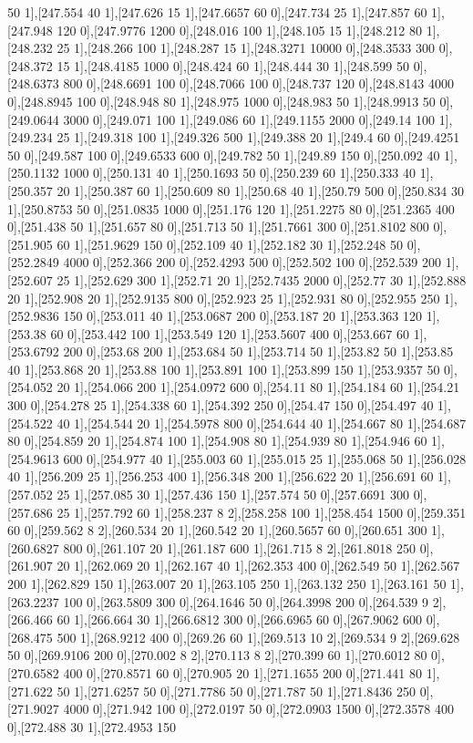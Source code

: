 {50 1],[247.554 40 1],[247.626 15 1],[247.6657 60 0],[247.734 25 1],[247.857 60 1],[247.948 120 0],[247.9776 1200 0],[248.016 100 1],[248.105 15 1],[248.212 80 1],[248.232 25 1],[248.266 100 1],[248.287 15 1],[248.3271 10000 0],[248.3533 300 0],[248.372 15 1],[248.4185 1000 0],[248.424 60 1],[248.444 30 1],[248.599 50 0],[248.6373 800 0],[248.6691 100 0],[248.7066 100 0],[248.737 120 0],[248.8143 4000 0],[248.8945 100 0],[248.948 80 1],[248.975 1000 0],[248.983 50 1],[248.9913 50 0],[249.0644 3000 0],[249.071 100 1],[249.086 60 1],[249.1155 2000 0],[249.14 100 1],[249.234 25 1],[249.318 100 1],[249.326 500 1],[249.388 20 1],[249.4 60 0],[249.4251 50 0],[249.587 100 0],[249.6533 600 0],[249.782 50 1],[249.89 150 0],[250.092 40 1],[250.1132 1000 0],[250.131 40 1],[250.1693 50 0],[250.239 60 1],[250.333 40 1],[250.357 20 1],[250.387 60 1],[250.609 80 1],[250.68 40 1],[250.79 500 0],[250.834 30 1],[250.8753 50 0],[251.0835 1000 0],[251.176 120 1],[251.2275 80 0],[251.2365 400 0],[251.438 50 1],[251.657 80 0],[251.713 50 1],[251.7661 300 0],[251.8102 800 0],[251.905 60 1],[251.9629 150 0],[252.109 40 1],[252.182 30 1],[252.248 50 0],[252.2849 4000 0],[252.366 200 0],[252.4293 500 0],[252.502 100 0],[252.539 200 1],[252.607 25 1],[252.629 300 1],[252.71 20 1],[252.7435 2000 0],[252.77 30 1],[252.888 20 1],[252.908 20 1],[252.9135 800 0],[252.923 25 1],[252.931 80 0],[252.955 250 1],[252.9836 150 0],[253.011 40 1],[253.0687 200 0],[253.187 20 1],[253.363 120 1],[253.38 60 0],[253.442 100 1],[253.549 120 1],[253.5607 400 0],[253.667 60 1],[253.6792 200 0],[253.68 200 1],[253.684 50 1],[253.714 50 1],[253.82 50 1],[253.85 40 1],[253.868 20 1],[253.88 100 1],[253.891 100 1],[253.899 150 1],[253.9357 50 0],[254.052 20 1],[254.066 200 1],[254.0972 600 0],[254.11 80 1],[254.184 60 1],[254.21 300 0],[254.278 25 1],[254.338 60 1],[254.392 250 0],[254.47 150 0],[254.497 40 1],[254.522 40 1],[254.544 20 1],[254.5978 800 0],[254.644 40 1],[254.667 80 1],[254.687 80 0],[254.859 20 1],[254.874 100 1],[254.908 80 1],[254.939 80 1],[254.946 60 1],[254.9613 600 0],[254.977 40 1],[255.003 60 1],[255.015 25 1],[255.068 50 1],[256.028 40 1],[256.209 25 1],[256.253 400 1],[256.348 200 1],[256.622 20 1],[256.691 60 1],[257.052 25 1],[257.085 30 1],[257.436 150 1],[257.574 50 0],[257.6691 300 0],[257.686 25 1],[257.792 60 1],[258.237 8 2],[258.258 100 1],[258.454 1500 0],[259.351 60 0],[259.562 8 2],[260.534 20 1],[260.542 20 1],[260.5657 60 0],[260.651 300 1],[260.6827 800 0],[261.107 20 1],[261.187 600 1],[261.715 8 2],[261.8018 250 0],[261.907 20 1],[262.069 20 1],[262.167 40 1],[262.353 400 0],[262.549 50 1],[262.567 200 1],[262.829 150 1],[263.007 20 1],[263.105 250 1],[263.132 250 1],[263.161 50 1],[263.2237 100 0],[263.5809 300 0],[264.1646 50 0],[264.3998 200 0],[264.539 9 2],[266.466 60 1],[266.664 30 1],[266.6812 300 0],[266.6965 60 0],[267.9062 600 0],[268.475 500 1],[268.9212 400 0],[269.26 60 1],[269.513 10 2],[269.534 9 2],[269.628 50 0],[269.9106 200 0],[270.002 8 2],[270.113 8 2],[270.399 60 1],[270.6012 80 0],[270.6582 400 0],[270.8571 60 0],[270.905 20 1],[271.1655 200 0],[271.441 80 1],[271.622 50 1],[271.6257 50 0],[271.7786 50 0],[271.787 50 1],[271.8436 250 0],[271.9027 4000 0],[271.942 100 0],[272.0197 50 0],[272.0903 1500 0],[272.3578 400 0],[272.488 30 1],[272.4953 150 }
